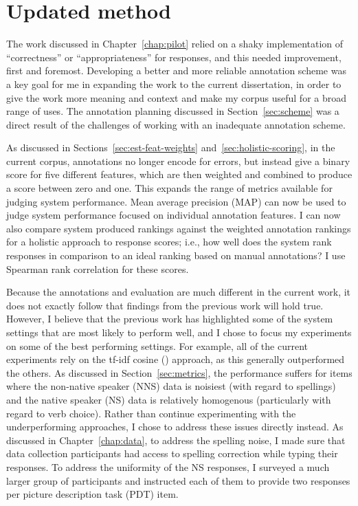 \section{Updated method}
\label{sec:current-method}
The work discussed in Chapter~\ref{chap:pilot} relied on a shaky implementation of ``correctness'' or ``appropriateness'' for responses, and this needed improvement, first and foremost. Developing a better and more reliable annotation scheme was a key goal for me in expanding the work to the current dissertation, in order to give the work more meaning and context and make my corpus useful for a broad range of uses. The annotation planning discussed in Section~\ref{sec:scheme} was a direct result of the challenges of working with an inadequate annotation scheme. 

As discussed in Sections~\ref{sec:est-feat-weights} and~\ref{sec:holistic-scoring}, in the current corpus, annotations no longer encode for errors, but instead give a binary score for five different features, which are then weighted and combined to produce a score between zero and one. This expands the range of metrics available for judging system performance. Mean average precision (MAP) can now be used to judge system performance focused on individual annotation features. I can now also compare system produced rankings against the weighted annotation rankings for a holistic approach to response scores; i.e., how well does the system rank responses in comparison to an ideal ranking based on manual annotations? I use Spearman rank correlation for these scores.

Because the annotations and evaluation are much different in the current work, it does not exactly follow that findings from the previous work will hold true. However, I believe that the previous work has highlighted some of the system settings that are most likely to perform well, and I chose to focus my experiments on some of the best performing settings. For example, all of the current experiments rely on the tf-idf cosine () approach, as this generally outperformed the others. As discussed in Section~\ref{sec:metrics}, the  performance suffers for items where the non-native speaker (NNS) data is noisiest (with regard to spellings) and the native speaker (NS) data is relatively homogenous (particularly with regard to verb choice). Rather than continue experimenting with the underperforming approaches, I chose to address these issues directly instead. As discussed in Chapter~\ref{chap:data}, to address the spelling noise, I made sure that data collection participants had access to spelling correction while typing their responses. To address the uniformity of the NS responses, I surveyed a much larger group of participants and instructed each of them to provide two responses per picture description task (PDT) item.

